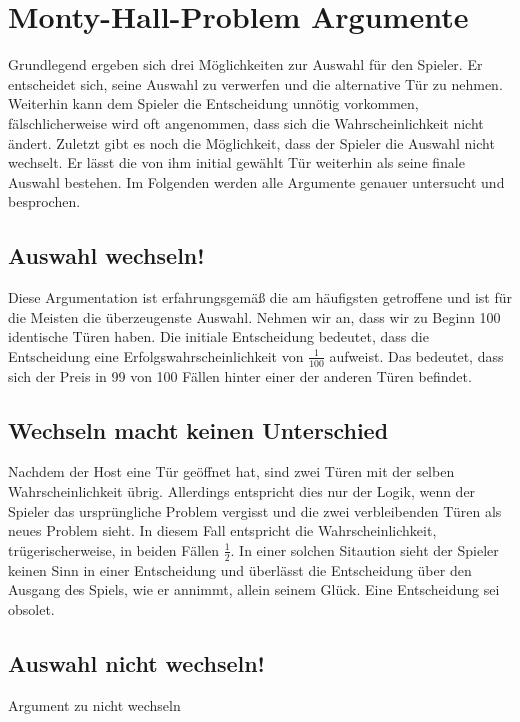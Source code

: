\chapter{Monty-Hall-Problem Argumente}

Grundlegend ergeben sich drei Möglichkeiten zur Auswahl für den Spieler. Er entscheidet sich, seine Auswahl zu verwerfen und die alternative Tür zu nehmen.
Weiterhin kann dem Spieler die Entscheidung unnötig vorkommen, fälschlicherweise wird oft angenommen, dass sich die Wahrscheinlichkeit nicht ändert. Zuletzt gibt es
noch die Möglichkeit, dass der Spieler die Auswahl nicht wechselt. Er lässt die von ihm initial gewählt Tür weiterhin als seine finale Auswahl bestehen.
Im Folgenden werden alle Argumente genauer untersucht und besprochen.

\section{Auswahl wechseln!}
Diese Argumentation ist erfahrungsgemäß die am häufigsten getroffene und ist für die Meisten die überzeugenste Auswahl. Nehmen wir an, dass wir zu Beginn
100 identische Türen haben. Die initiale Entscheidung bedeutet, dass die Entscheidung eine Erfolgswahrscheinlichkeit von $\frac{1}{100}$ aufweist. Das bedeutet,
dass sich der Preis in 99 von 100 Fällen hinter einer der anderen Türen befindet.

\section{Wechseln macht keinen Unterschied}
Nachdem der Host eine Tür geöffnet hat, sind zwei Türen mit der selben Wahrscheinlichkeit übrig. Allerdings entspricht dies nur der Logik, wenn der Spieler das
ursprüngliche Problem vergisst und die zwei verbleibenden Türen als neues Problem sieht. In diesem Fall entspricht die Wahrscheinlichkeit, trügerischerweise, in
beiden Fällen $\frac{1}{2}$. In einer solchen Sitaution sieht der Spieler keinen Sinn in einer Entscheidung und überlässt die Entscheidung über den Ausgang
des Spiels, wie er annimmt, allein seinem Glück. Eine Entscheidung sei obsolet.


\section{Auswahl nicht wechseln!}
Argument zu nicht wechseln
